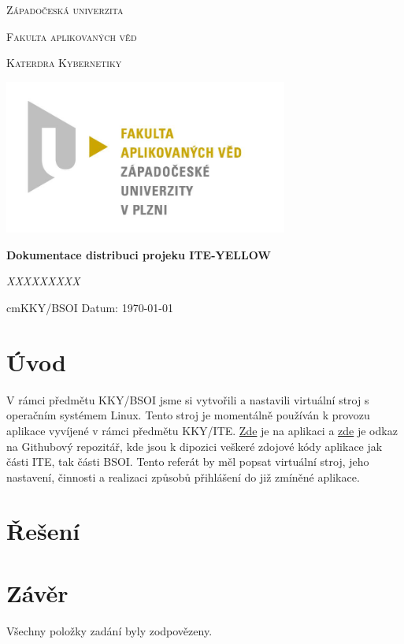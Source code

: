 \documentclass{article}
\begin{document}
\begin{titlepage}

    \centering

    {\scshape\LARGE Západočeská univerzita\par}
    {\scshape\Large Fakulta aplikovaných věd \par}
    {\scshape\Large Katerdra Kybernetiky \par}
    {\begin{center}
            \includegraphics[width=0.7\textwidth]{../pic/fav.jpg}
        \end{center}}

    {\huge\bfseries Dokumentace distribuci projeku ITE-YELLOW\par} %

    \vspace{2cm}

    {\Large\itshape XXXXXXXXX \par}

    \vfill

    \vspace{1cm}

     cm{KKY/BSOI} \hfill {Datum: \today }



\end{titlepage}

\section{Úvod}
V rámci předmětu KKY/BSOI jsme si vytvořili a nastavili virtuální stroj s operačním systémem Linux. 
Tento stroj je momentálně používán k provozu aplikace vyvíjené v rámci předmětu KKY/ITE. \href{http://147.228.173.162:8881}{Zde} je na aplikaci a \href{https://github.com/RadekKaupe/ITE-Yellow-2024}{zde} je odkaz na Githubový repozitář, kde jsou k dipozici veškeré zdojové kódy aplikace jak části ITE, tak části BSOI. 
Tento referát by měl popsat virtuální stroj, jeho nastavení, činnosti a realizaci způsobů přihlášení do již zmíněné aplikace.   
\section{Řešení}









\section{Závěr}
Všechny položky zadání byly zodpovězeny.
\end{document}
